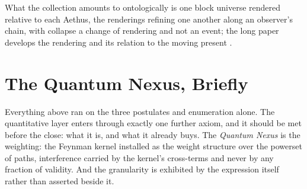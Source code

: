 \documentclass[11pt]{article}
\theoremstyle{definition}
\newcommand{\Aethus}{Aethus}
\begin{document}

What the collection amounts to ontologically is one block universe rendered relative to each Aethus, the renderings refining one another along an observer's chain, with collapse a change of rendering and not an event; the long paper develops the rendering and its relation to the moving present \cite{Aethus}.



\section{The Quantum Nexus, Briefly}\label{sec:nexus}

Everything above ran on the three postulates and enumeration alone. The quantitative layer enters through exactly one further axiom, and it should be met before the close: what it is, and what it already buys. The \emph{Quantum Nexus} is the weighting: the Feynman kernel installed as the weight structure over the powerset of paths, interference carried by the kernel's cross-terms and never by any fraction of validity. And the granularity is exhibited by the expression itself rather than asserted beside it.
\end{document}
